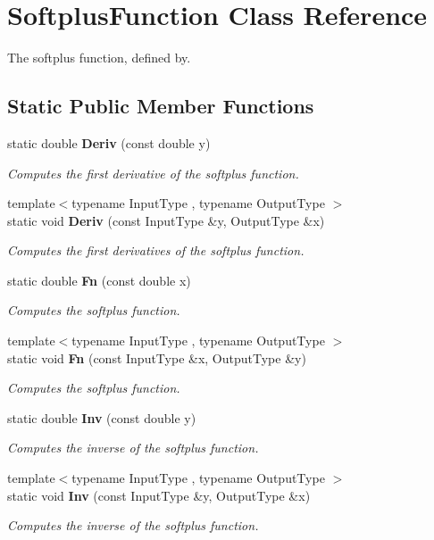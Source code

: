 \section{Softplus\+Function Class Reference}
\label{classmlpack_1_1ann_1_1SoftplusFunction}


The softplus function, defined by.  


\subsection*{Static Public Member Functions}
\begin{DoxyCompactItemize}
\item 
static double \textbf{ Deriv} (const double y)
\begin{DoxyCompactList}\small\item\em Computes the first derivative of the softplus function. \end{DoxyCompactList}\item 
{\footnotesize template$<$typename Input\+Type , typename Output\+Type $>$ }\\static void \textbf{ Deriv} (const Input\+Type \&y, Output\+Type \&x)
\begin{DoxyCompactList}\small\item\em Computes the first derivatives of the softplus function. \end{DoxyCompactList}\item 
static double \textbf{ Fn} (const double x)
\begin{DoxyCompactList}\small\item\em Computes the softplus function. \end{DoxyCompactList}\item 
{\footnotesize template$<$typename Input\+Type , typename Output\+Type $>$ }\\static void \textbf{ Fn} (const Input\+Type \&x, Output\+Type \&y)
\begin{DoxyCompactList}\small\item\em Computes the softplus function. \end{DoxyCompactList}\item 
static double \textbf{ Inv} (const double y)
\begin{DoxyCompactList}\small\item\em Computes the inverse of the softplus function. \end{DoxyCompactList}\item 
{\footnotesize template$<$typename Input\+Type , typename Output\+Type $>$ }\\static void \textbf{ Inv} (const Input\+Type \&y, Output\+Type \&x)
\begin{DoxyCompactList}\small\item\em Computes the inverse of the softplus function. \end{DoxyCompactList}\end{DoxyCompactItemize}


